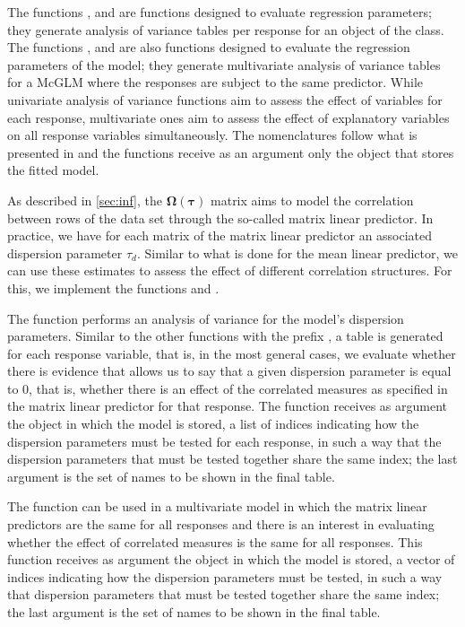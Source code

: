 \documentclass[article]{jss}\usepackage[]{graphicx}\usepackage[]{xcolor}
\begin{document}
The functions ,  and  are functions designed to evaluate regression parameters; they generate analysis of variance tables per response for an object of the  class. The functions ,  and  are also functions designed to evaluate the regression parameters of the model; they generate multivariate analysis of variance tables for a McGLM where the responses are subject to the same predictor. While univariate analysis of variance functions aim to assess the effect of variables for each response, multivariate ones aim to assess the effect of explanatory variables on all response variables simultaneously. The nomenclatures follow what is presented in \citet{htmcglm_proposta} and the functions receive as an argument only the object that stores the fitted model.

As described in \autoref{sec:inf}, the $\boldsymbol{\Omega({\tau})}$ matrix aims to model the correlation between rows of the data set through the so-called matrix linear predictor. In practice, we have for each matrix of the matrix linear predictor an associated dispersion parameter $\tau_d$. Similar to what is done for the mean linear predictor, we can use these estimates to assess the effect of different correlation structures. For this, we implement the functions  and .

The  function performs an analysis of variance for the model's dispersion parameters. Similar to the other functions with the prefix , a table is generated for each response variable, that is, in the most general cases, we evaluate whether there is evidence that allows us to say that a given dispersion parameter is equal to 0, that is, whether there is an effect of the correlated measures as specified in the matrix linear predictor for that response. The function receives as argument the object in which the model is stored, a list of indices indicating how the dispersion parameters must be tested for each response, in such a way that the dispersion parameters that must be tested together share the same index; the last argument is the set of names to be shown in the final table.

The  function can be used in a multivariate model in which the matrix linear predictors are the same for all responses and there is an interest in evaluating whether the effect of correlated measures is the same for all responses. This function receives as argument the object in which the model is stored, a vector of indices indicating how the dispersion parameters must be tested, in such a way that dispersion parameters that must be tested together share the same index; the last argument is the set of names to be shown in the final table.
\end{document}

